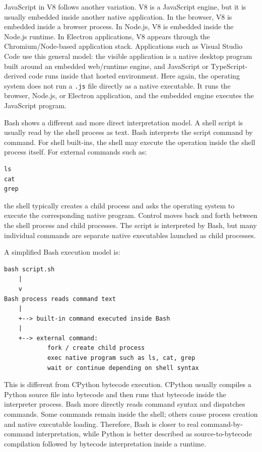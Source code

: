 \documentclass[a4paper,twoside]{report}
\begin{document}
JavaScript in V8 follows another variation. V8 is a JavaScript engine, but it is usually embedded inside another native application. In the browser, V8 is embedded inside a browser process. In Node.js, V8 is embedded inside the Node.js runtime. In Electron applications, V8 appears through the Chromium/Node-based application stack. Applications such as Visual Studio Code use this general model: the visible application is a native desktop program built around an embedded web/runtime engine, and JavaScript or TypeScript-derived code runs inside that hosted environment. Here again, the operating system does not run a \texttt{.js} file directly as a native executable. It runs the browser, Node.js, or Electron application, and the embedded engine executes the JavaScript program.

Bash shows a different and more direct interpretation model. A shell script is usually read by the shell process as text. Bash interprets the script command by command. For shell built-ins, the shell may execute the operation inside the shell process itself. For external commands such as:

\begin{verbatim}
ls
cat
grep
\end{verbatim}

the shell typically creates a child process and asks the operating system to execute the corresponding native program. Control moves back and forth between the shell process and child processes. The script is interpreted by Bash, but many individual commands are separate native executables launched as child processes.

A simplified Bash execution model is:

\begin{verbatim}
bash script.sh
    |
    v
Bash process reads command text
    |
    +--> built-in command executed inside Bash
    |
    +--> external command:
            fork / create child process
            exec native program such as ls, cat, grep
            wait or continue depending on shell syntax
\end{verbatim}

This is different from CPython bytecode execution. CPython usually compiles a Python source file into bytecode and then runs that bytecode inside the interpreter process. Bash more directly reads command syntax and dispatches commands. Some commands remain inside the shell; others cause process creation and native executable loading. Therefore, Bash is closer to real command-by-command interpretation, while Python is better described as source-to-bytecode compilation followed by bytecode interpretation inside a runtime.
\end{document}

